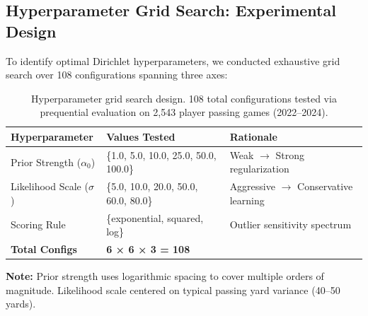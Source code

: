 \subsection{Hyperparameter Grid Search: Experimental Design}
\label{subsec:grid-search-design}

To identify optimal Dirichlet hyperparameters, we conducted exhaustive grid search over 108 configurations spanning three axes:

\begin{table}[htbp]
\centering
\caption[Dirichlet hyperparameter search space]{Hyperparameter grid search design. 108 total configurations tested via prequential evaluation on 2,543 player passing games (2022--2024).}
\label{tab:grid-search-space}
\begin{threeparttable}
\small
\setlength{\tabcolsep}{4pt}
\begin{tabular}{@{}lll@{}}
\toprule
\textbf{Hyperparameter} & \textbf{Values Tested} & \textbf{Rationale} \\
\midrule
Prior Strength ($\alpha_0$) & \{1.0, 5.0, 10.0, 25.0, 50.0, 100.0\} & Weak $\to$ Strong regularization \\
Likelihood Scale ($\sigma$) & \{5.0, 10.0, 20.0, 50.0, 60.0, 80.0\} & Aggressive $\to$ Conservative learning \\
Scoring Rule & \{exponential, squared, log\} & Outlier sensitivity spectrum \\
\midrule
\textbf{Total Configs} & \textbf{6 × 6 × 3 = 108} & \\
\bottomrule
\end{tabular}
\begin{tablenotes}
\footnotesize
\item \textbf{Note:} Prior strength uses logarithmic spacing to cover multiple orders of magnitude. Likelihood scale centered on typical passing yard variance (40--50 yards).
\end{tablenotes}
\end{threeparttable}
\end{table}

